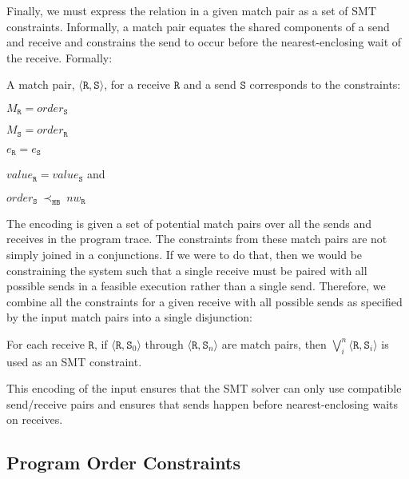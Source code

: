 Finally, we must express the relation in a given match pair as a set of SMT
constraints. Informally, a match pair equates the shared components of
a send and receive and constrains the send to occur before the
nearest-enclosing wait of the receive. Formally:

\begin{definition} \label{def:match}
A match pair, $\langle\mathtt{R}, \mathtt{S}\rangle$, for a receive
$\mathtt{R}$ and a send $\mathtt{S}$ corresponds to the constraints:
\begin{compactenum}
\item $M_{\mathtt{R}} = \mathit{order}_{\mathtt{S}}$
\item $M_{\mathtt{S}} = \mathit{order}_{\mathtt{R}}$
\item $e_{\mathtt{R}} = e_{\mathtt{S}}$
\item $\mathit{value}_{\mathtt{R}} = \mathit{value}_{\mathtt{S}}$ and
\item $\mathit{order}_{\mathtt{S}}\ \mathrm{\prec_\mathtt{HB}}\ \mathit{nw}_{\mathtt{R}}$
\end{compactenum}
\end{definition}

The encoding is given a set of potential match pairs over all the
sends and receives in the program trace. The constraints from these
match pairs are not simply joined in a conjunctions. If we were to do that, then we
would be constraining the system such that a single receive must be
paired with all possible sends in a feasible execution rather than a
single send. Therefore, we combine all the constraints for a given
receive with all possible sends as specified by the input match pairs
into a single disjunction:

\begin{definition}
For each receive $\mathtt{R}$, if $\langle\mathtt{R},
\mathtt{S}_0\rangle$ through $\langle\mathtt{R}, \mathtt{S}_n\rangle$
are match pairs, then $\bigvee_{i}^{n} \langle\mathtt{R},
\mathtt{S}_i\rangle$ is used as an SMT constraint.
\end{definition}

This encoding of the input ensures that the SMT solver can only use
compatible send/receive pairs and ensures that sends happen before
nearest-enclosing waits on receives.

\subsection{Program Order Constraints}

